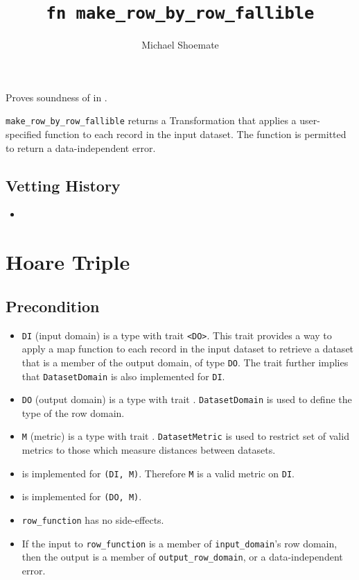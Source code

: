 \documentclass{article}
\title{\texttt{fn make\_row\_by\_row\_fallible}}
\author{Michael Shoemate}
\date{}
\begin{document}
\maketitle

\contrib
Proves soundness of  in .

\texttt{make\_row\_by\_row\_fallible} returns a Transformation that applies a user-specified function to each record in the input dataset.
The function is permitted to return a data-independent error.

\subsection*{Vetting History}
\begin{itemize}
    \item {}
\end{itemize}

\section{Hoare Triple}
\subsection*{Precondition}
\begin{itemize}

    \item \texttt{DI} (input domain) is a type with trait \texttt{<DO>}. 
        This trait provides a way to apply a map function to each record in the input dataset to retrieve a dataset that is a member of the output domain, of type \texttt{DO}. The trait further implies that \texttt{DatasetDomain} is also implemented for \texttt{DI}.
    \item \texttt{DO} (output domain) is a type with trait . 
        \texttt{DatasetDomain} is used to define the type of the row domain.
    \item \texttt{M} (metric) is a type with trait . 
        \texttt{DatasetMetric} is used to restrict set of valid metrics to those which measure distances between datasets.
    \item {} is implemented for \texttt{(DI, M)}. Therefore \texttt{M} is a valid metric on \texttt{DI}.
    \item {} is implemented for \texttt{(DO, M)}.
    \item \texttt{row\_function} has no side-effects.
    \item If the input to \texttt{row\_function} is a member of \texttt{input\_domain}'s row domain, then the output is a member of \texttt{output\_row\_domain}, or a data-independent error.
\end{itemize}
\end{document}
